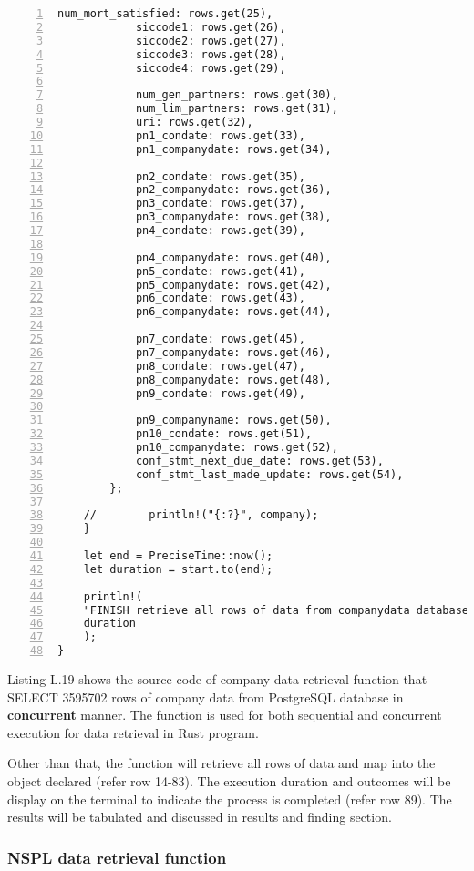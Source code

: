 \begin{lstlisting}[breaklines, frame=single, numbers=left, caption={Function for company data retrieval. (company.rs)}, label=commandline-02]
			num_mort_satisfied: rows.get(25),
			siccode1: rows.get(26),
			siccode2: rows.get(27),
			siccode3: rows.get(28),
			siccode4: rows.get(29),
			
			num_gen_partners: rows.get(30),
			num_lim_partners: rows.get(31),
			uri: rows.get(32),
			pn1_condate: rows.get(33),
			pn1_companydate: rows.get(34),
			
			pn2_condate: rows.get(35),
			pn2_companydate: rows.get(36),
			pn3_condate: rows.get(37),
			pn3_companydate: rows.get(38),
			pn4_condate: rows.get(39),
			
			pn4_companydate: rows.get(40),
			pn5_condate: rows.get(41),
			pn5_companydate: rows.get(42),
			pn6_condate: rows.get(43),
			pn6_companydate: rows.get(44),
			
			pn7_condate: rows.get(45),
			pn7_companydate: rows.get(46),
			pn8_condate: rows.get(47),
			pn8_companydate: rows.get(48),
			pn9_condate: rows.get(49),
			
			pn9_companyname: rows.get(50),
			pn10_condate: rows.get(51),
			pn10_companydate: rows.get(52),
			conf_stmt_next_due_date: rows.get(53),
			conf_stmt_last_made_update: rows.get(54),
		};

	//        println!("{:?}", company);
	}
	
	let end = PreciseTime::now();
	let duration = start.to(end);
	
	println!(
	"FINISH retrieve all rows of data from companydata database with {} seconds.",
	duration
	);
}

\end{lstlisting}

Listing L.19 shows the source code of company data retrieval function that SELECT 3595702 rows of company data from PostgreSQL database in \textbf{concurrent} manner. The function is used for both sequential and concurrent execution for data retrieval in Rust program. 

Other than that, the function will retrieve all rows of data and map into the object declared (refer row 14-83). The execution duration and outcomes will be display on the terminal to indicate the process is completed (refer row 89). The results will be tabulated and discussed in results and finding section. 

\newpage

\subsubsection{NSPL data retrieval function}

